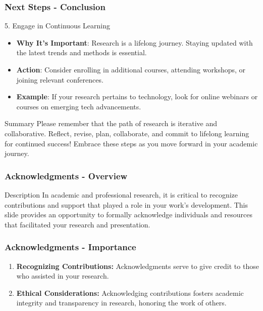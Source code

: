 \documentclass[aspectratio=169]{beamer}
\begin{document}
\begin{frame}[fragile]
    \frametitle{Next Steps - Conclusion}
    
    \begin{block}{5. Engage in Continuous Learning}
        \begin{itemize}
            \item \textbf{Why It's Important}: Research is a lifelong journey. Staying updated with the latest trends and methods is essential.
            \item \textbf{Action}: Consider enrolling in additional courses, attending workshops, or joining relevant conferences.
            \item \textbf{Example}: If your research pertains to technology, look for online webinars or courses on emerging tech advancements.
        \end{itemize}
    \end{block}
    
    \begin{block}{Summary}
        Please remember that the path of research is iterative and collaborative. 
        Reflect, revise, plan, collaborate, and commit to lifelong learning for continued success! 
        Embrace these steps as you move forward in your academic journey.
    \end{block}
\end{frame}

\begin{frame}[fragile]
    \frametitle{Acknowledgments - Overview}
    \begin{block}{Description}
        In academic and professional research, it is critical to recognize contributions and support that played a role in your work's development. This slide provides an opportunity to formally acknowledge individuals and resources that facilitated your research and presentation.
    \end{block}
\end{frame}

\begin{frame}[fragile]
    \frametitle{Acknowledgments - Importance}
    \begin{enumerate}
        \item \textbf{Recognizing Contributions:} 
        Acknowledgments serve to give credit to those who assisted in your research.
        
        \item \textbf{Ethical Considerations:} 
        Acknowledging contributions fosters academic integrity and transparency in research, honoring the work of others.
    \end{enumerate}
\end{frame}
\end{document}
